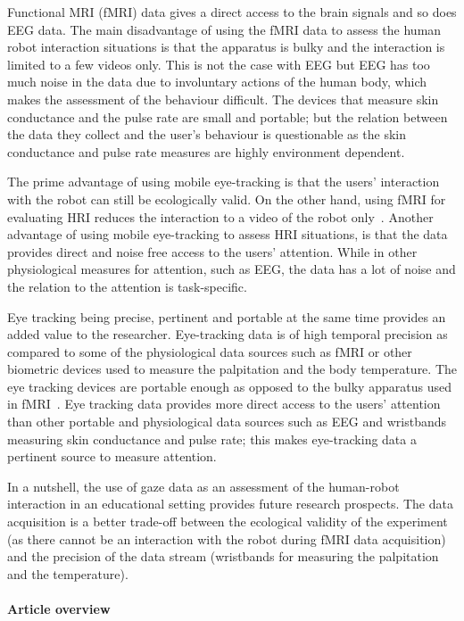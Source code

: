 \documentclass{sig-alternate}
\begin{document}
Functional MRI (fMRI) data gives a direct access to the brain signals and so does EEG data.  The main disadvantage of using the fMRI data to assess the human robot interaction situations is that the apparatus is bulky and the interaction is limited to a few videos only. This is not the case with EEG but EEG has too much noise in the data due to involuntary actions of the human  body, which makes the assessment of the behaviour difficult. The devices that measure skin conductance and the pulse rate are  small and portable; but the relation between the data they collect and the user's behaviour is questionable as the skin conductance and pulse rate measures are highly environment dependent.


The prime advantage of using mobile eye-tracking is that the users' interaction with the robot can still be ecologically valid. On the other hand, using fMRI for evaluating HRI reduces the interaction to a video of the robot only~\cite{rosenthal2013neural}. Another advantage of using mobile eye-tracking to assess HRI situations, is that the data provides direct and noise free access to the users' attention. While in other physiological measures for attention, such as EEG, the data has a lot of noise and the relation to the attention is  task-specific.

Eye tracking being precise, pertinent and portable at the same time provides an added value to the researcher.  Eye-tracking data is of high temporal precision as compared to some of the physiological data sources such as fMRI or other biometric devices used to measure the palpitation and the body temperature. The eye tracking devices are portable enough as opposed to the bulky apparatus used in fMRI~\cite{rosenthal2013neural}. Eye tracking data provides more direct access to the users' attention than other portable and physiological data sources such as EEG and wristbands measuring skin conductance and pulse rate; this makes eye-tracking data a pertinent source to measure attention.


In a nutshell, the use of gaze data as an assessment of the human-robot
interaction in an educational setting provides future research prospects. The
data acquisition is a better trade-off between the ecological validity of the
experiment (as there cannot be an interaction with the robot during fMRI data
acquisition) and the precision of the data stream (wristbands for measuring the
palpitation and the temperature).

\paragraph{Article overview}
\end{document}
